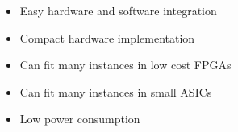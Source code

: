 \begin{itemize}
\item Easy hardware and software integration
\item Compact hardware implementation
\item Can fit many instances in low cost FPGAs
\item Can fit many instances in small ASICs 
\item Low power consumption
\end{itemize}

